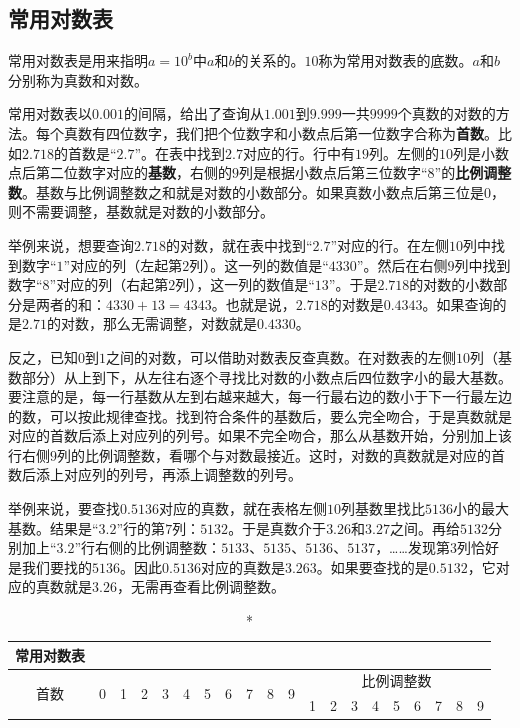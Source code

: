 \documentclass[12pt,UTF8]{ctexbook}
\begin{document}
\begin{appendix}

\chapter{常用对数表}

常用对数表是用来指明$a = 10^b$中$a$和$b$的关系的。$10$称为常用对数表的底数。$a$和$b$分别称为真数和对数。

常用对数表以$0.001$的间隔，给出了查询从$1.001$到$9.999$一共$9999$个真数的对数的方法。每个真数有四位数字，我们把个位数字和小数点后第一位数字合称为\textbf{首数}。比如$2.718$的首数是“$2.7$”。在表中找到$2.7$对应的行。行中有$19$列。左侧的$10$列是小数点后第二位数字对应的\textbf{基数}，右侧的$9$列是根据小数点后第三位数字“$8$”的\textbf{比例调整数}。基数与比例调整数之和就是对数的小数部分。如果真数小数点后第三位是$0$，则不需要调整，基数就是对数的小数部分。

举例来说，想要查询$2.718$的对数，就在表中找到“$2.7$”对应的行。在左侧$10$列中找到数字“$1$”对应的列（左起第$2$列）。这一列的数值是“$4330$”。然后在右侧$9$列中找到数字“$8$”对应的列（右起第$2$列），这一列的数值是“$13$”。于是$2.718$的对数的小数部分是两者的和：$4330 + 13 = 4343$。也就是说，$2.718$的对数是$0.4343$。如果查询的是$2.71$的对数，那么无需调整，对数就是$0.4330$。

反之，已知$0$到$1$之间的对数，可以借助对数表反查真数。在对数表的左侧$10$列（基数部分）从上到下，从左往右逐个寻找比对数的小数点后四位数字小的最大基数。要注意的是，每一行基数从左到右越来越大，每一行最右边的数小于下一行最左边的数，可以按此规律查找。找到符合条件的基数后，要么完全吻合，于是真数就是对应的首数后添上对应列的列号。如果不完全吻合，那么从基数开始，分别加上该行右侧$9$列的比例调整数，看哪个与对数最接近。这时，对数的真数就是对应的首数后添上对应列的列号，再添上调整数的列号。

举例来说，要查找$0.5136$对应的真数，就在表格左侧$10$列基数里找比$5136$小的最大基数。结果是“$3.2$”行的第$7$列：$5132$。于是真数介于$3.26$和$3.27$之间。再给$5132$分别加上“$3.2$”行右侧的比例调整数：$5133$、$5135$、$5136$、$5137$，……发现第$3$列恰好是我们要找的$5136$。因此$0.5136$对应的真数是$3.263$。如果要查找的是$0.5132$，它对应的真数就是$3.26$，无需再查看比例调整数。

\vspace{8pt}

\setlength{\tabcolsep}{2pt} %
\begin{longtable}{|c| c c c c c | c c c c c| c c c c c c c c c|}
\caption*{\textbf{常用对数表}} \\
\toprule
\multirow{2}{*}{首数} & \multirow{2}{*}{0} & \multirow{2}{*}{1} & \multirow{2}{*}{2} & \multirow{2}{*}{3} & \multirow{2}{*}{4} & \multirow{2}{*}{5} & \multirow{2}{*}{6} & \multirow{2}{*}{7} & \multirow{2}{*}{8} & \multirow{2}{*}{9} & \multicolumn{9}{c}{\phantom{啊w}比例调整数\phantom{啊w}} \\
\cline{12-20}
 &  &  &  &  &  &  &  &  &  &  & 1 & 2 & 3 & 4 & 5 & 6 & 7 & 8 & 9 \\
\midrule
\endfirsthead


\end{longtable}
\end{appendix}
\end{document}
